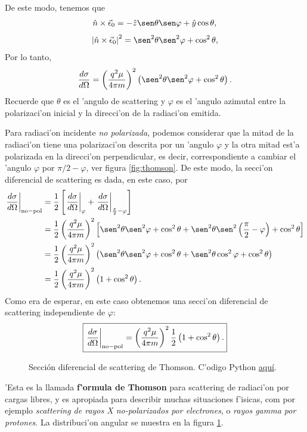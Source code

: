 De este modo, tenemos que
\begin{align}
\hat{n}\times\vec{\epsilon}_0 = -\hat{z}\sen\theta\sen\varphi +\hat{y}\cos\theta,
\end{align}
\begin{align}
\left|\hat{n}\times\vec{\epsilon}_0\right|^2 = \sen^2\theta\sen^2\varphi +\cos^2\theta,
\end{align}
Por lo tanto,
\begin{equation}
\frac{d\sigma}{d\Omega}=\left(\frac{q^2\mu}{4\pi m}\right)^2
\left( \sen^2\theta\sen^2\varphi +\cos^2\theta \right).
\end{equation}
Recuerde que $\theta$ es el 'angulo de scattering y $\varphi$ es el 'angulo
azimutal entre la polarizaci'on inicial y la direcci'on de la radiaci'on
emitida.

Para radiaci'on incidente \textit{no polarizada}, podemos considerar que la
mitad de la radiaci'on tiene una polarizaci'on descrita por un 'angulo $\varphi$
y la otra mitad est'a polarizada en la direcci'on perpendicular, es decir,
correspondiente a cambiar el 'angulo $\varphi$ por ${\pi}/{2}-\varphi$, ver figura  \ref{fig:thomson}. De este modo, la secci'on diferencial de scattering es dada, en este caso, por
\begin{align}
\left. \frac{d\sigma}{d\Omega}\right|_{\rm no-pol}&=\frac{1}{2}\left[\left.
\frac{d\sigma}{d\Omega}\right|_\varphi+\left.
\frac{d\sigma}{d\Omega}\right|_{\frac{\pi}{2}-\varphi}\right] \\
&=\frac{1}{2}\left(\frac{q^2\mu}{4\pi m}\right)^2\left[\sen^2\theta\sen^2\varphi +\cos^2\theta +\sen^2\theta\sen^2\left(\frac{\pi}{2}-\varphi\right) +\cos^2\theta\right]\\
&=\frac{1}{2}\left(\frac{q^2\mu}{4\pi m}\right)^2\left(\sen^2\theta\sen^2\varphi +\cos^2\theta +\sen^2\theta\cos^2\varphi +\cos^2\theta\right)\\
&=\frac{1}{2}\left(\frac{q^2\mu}{4\pi m}\right)^2\left(1+\cos^2\theta\right).
\end{align}
Como era de esperar, en este caso obtenemos una secci'on diferencial de scattering independiente de $\varphi$:
\begin{equation}
\boxed{\left.\frac{d\sigma}{d\Omega}\right|_{\rm no-pol}=\left(\frac{q^2\mu}{4\pi m}\right)^2\frac{1}
{2}\left(1+\cos^2\theta\right) .}
\end{equation}
\begin{figure}[H]
\centerline{}
 \caption{Secci\'on diferencial de scattering de Thomson. C'odigo Python \href{https://github.com/gfrubi/electrodinamica/blob/master/figuras-editables/fig-Thomson.py}{aqu\'i}.}
\label{fig:thomson_2d}
\end{figure}
'Esta es la llamada \textbf{f'ormula de Thomson} para scattering de radiaci'on
por cargas libres, y es apropiada para describir muchas situaciones f'isicas, com por ejemplo \textit{scattering de rayos X no-polarizados por electrones}, o \textit{rayos gamma por protones}. 
La distribuci'on angular se muestra en la figura \ref{fig:thomson_2d}. 

